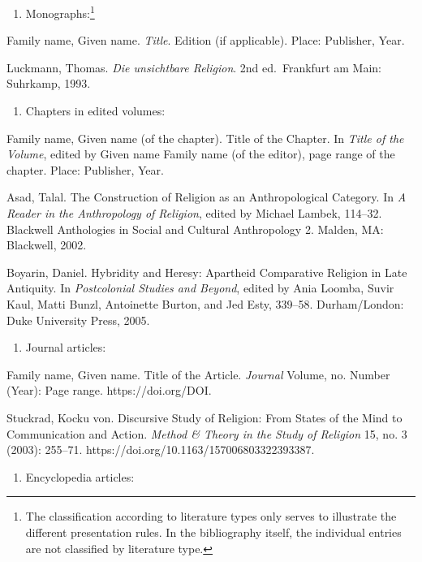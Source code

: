 \documentclass[
  english,
]{scrreprt}
\providecommand{\tightlist}{%
  \setlength{\itemsep}{0pt}\setlength{\parskip}{0pt}}
\begin{document}
\begin{enumerate}
\def\labelenumi{\alph{enumi})}
\tightlist
\item
  Monographs:\footnote{The classification according to literature types only serves to illustrate the different presentation rules. In the bibliography itself, the individual entries are not classified by literature type.}
\end{enumerate}

Family name, Given name. \emph{Title}. Edition (if applicable). Place: Publisher, Year.

Luckmann, Thomas. \emph{Die unsichtbare Religion}. 2nd ed.~Frankfurt am Main: Suhrkamp, 1993.

\begin{enumerate}
\def\labelenumi{\alph{enumi})}
\setcounter{enumi}{1}
\tightlist
\item
  Chapters in edited volumes:
\end{enumerate}

Family name, Given name (of the chapter). Title of the Chapter. In \emph{Title of the Volume}, edited by Given name Family name (of the editor), page range of the chapter. Place: Publisher, Year.

Asad, Talal. The Construction of Religion as an Anthropological Category. In \emph{A Reader in the Anthropology of Religion}, edited by Michael Lambek, 114–32. Blackwell Anthologies in Social and Cultural Anthropology 2. Malden, MA: Blackwell, 2002.

Boyarin, Daniel. Hybridity and Heresy: Apartheid Comparative Religion in Late Antiquity. In \emph{Postcolonial Studies and Beyond}, edited by Ania Loomba, Suvir Kaul, Matti Bunzl, Antoinette Burton, and Jed Esty, 339–58. Durham/London: Duke University Press, 2005.

\begin{enumerate}
\def\labelenumi{\alph{enumi})}
\setcounter{enumi}{2}
\tightlist
\item
  Journal articles:
\end{enumerate}

Family name, Given name. Title of the Article. \emph{Journal} Volume, no. Number (Year): Page range. https://doi.org/DOI.

Stuckrad, Kocku von. Discursive Study of Religion: From States of the Mind to Communication and Action. \emph{Method \& Theory in the Study of Religion} 15, no. 3 (2003): 255–71. https://doi.org/10.1163/157006803322393387.

\begin{enumerate}
\def\labelenumi{\alph{enumi})}
\setcounter{enumi}{3}
\tightlist
\item
  Encyclopedia articles:
\end{enumerate}
\end{document}
